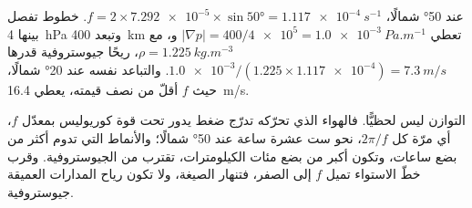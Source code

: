 \begin{example}\label{ex:b1:atmospheric-circulation:geostrophic}
عند \ang{50} شمالًا، $f = 2 \times \num{7.292e-5} \times \sin\ang{50} = \qty{1.117e-4}{s^{-1}}$.
خطوط تفصل بينها \qty{4}{hPa} وتبعد \qty{400}{km} تعطي $|\nabla p| = 400/\num{4e5} =
\qty{1.0e-3}{Pa.m^{-1}}$ و، مع $\rho = \qty{1.225}{kg.m^{-3}}$، ريحًا جيوستروفية قدرها $\num{1.0e-3}/(1.225 \times \num{1.117e-4}) = \qty{7.3}{m/s}$. والتباعد نفسه عند \ang{20} شمالًا، حيث $f$ أقلّ من نصف قيمته، يعطي \qty{16.4}{m/s}.
\end{example}

التوازن ليس لحظيًّا. فالهواء الذي تحرّكه تدرّج ضغط يدور تحت قوة كوريوليس بمعدّل $f$، أي مرّة كل $2\pi/f$، نحو ست عشرة ساعة عند \ang{50} شمالًا؛ والأنماط التي تدوم أكثر من بضع ساعات، وتكون أكبر من بضع مئات الكيلومترات، تقترب من الجيوستروفية. وقرب خطّ الاستواء تميل $f$ إلى الصفر، فتنهار الصيغة، ولا تكون رياح المدارات العميقة جيوستروفية.

